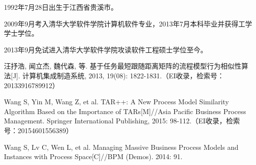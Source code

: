 \begin{resume}


  1992年7月28日出生于江西省贵溪市。

  2009年9月考入清华大学软件学院计算机软件专业，2013年7月本科毕业并获得工学学士学位。

  2013年9月免试进入清华大学软件学院攻读软件工程硕士学位至今。


  \begin{publications}
    \item 汪抒浩, 闻立杰, 魏代森, 等. 基于任务最短跟随距离矩阵的流程模型行为相似性算法[J]. 计算机集成制造系统, 2013, 19(08): 1822-1831.（EI收录，检索号：20133916789912）
    \item Wang S, Yin M, Wang Z, et al. TAR++: A New Process Model Similarity Algorithm Based on the Importance of TARs[M]//Asia Pacific Business Process Management. Springer International Publishing, 2015: 98-112.（EI收录，检索号：20154601556389）
    \item Wang S, Lv C, Wen L, et al. Managing Massive Business Process Models and Instances with Process Space[C]//BPM (Demos). 2014: 91.
  \end{publications}




\end{resume}
